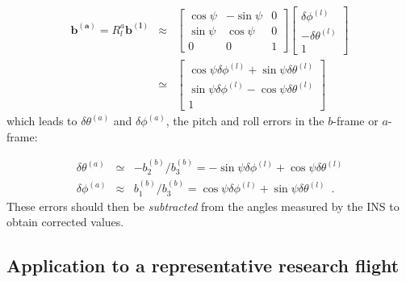 \documentclass[english,british,amtd,bookmarks=false,unicode=true]{copernicus}\usepackage[]{graphicx}\usepackage[]{color}
\begin{document}
\begin{eqnarray}
\mathbf{b^{(a)}=}R_{l}^{a}\mathbf{b^{(l)}} & \approx & \left[\begin{array}{ccc}
\cos\psi & -\sin\psi & 0\\
\sin\psi & \cos\psi & 0\\
0 & 0 & 1
\end{array}\right]\begin{bmatrix}\delta\phi^{(l)}\\
-\delta\theta^{(l)}\\
1
\end{bmatrix}\label{eq:b-vector-in-b-frame}\\
 & \simeq & \begin{bmatrix}\cos\psi\delta\phi^{(l)}+\sin\psi\delta\theta^{(l)}\\
\sin\psi\delta\phi^{(l)}-\cos\psi\delta\theta^{(l)}\\
1
\end{bmatrix}
\end{eqnarray}
which leads to $\delta\theta^{(a)}$ and $\delta\phi^{(a)}$, the
pitch and roll errors in the $b$-frame or $a$-frame:

\begin{eqnarray}
\delta\theta^{(a)} & \simeq & -b_{2}^{(b)}/b_{3}^{(b)}=-\sin\psi\delta\phi^{(l)}+\cos\psi\delta\theta^{(l)}\label{eq:final-answer}\\
\delta\phi^{(a)} & \approx & b_{1}^{(b)}/b_{3}^{(b)}=\cos\psi\delta\phi^{(l)}+\sin\psi\delta\theta^{(l)}\,\,\,.\nonumber 
\end{eqnarray}
These errors should then be \emph{subtracted} from the angles measured
by the INS to obtain corrected values. 




\subsection{Application to a representative research flight\label{sub:Application-to-research}}
\end{document}
